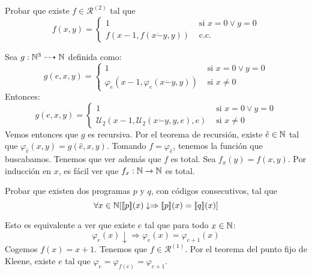 \documentclass[twoside]{article}
\begin{document}
\newpage

\begin{ejercicio}{18}
Probar que existe $f \in \mathcal{R}^{(2)}$ tal que
\[ f(x,y) = \begin{cases}
	1 &\text{ si }x = 0 \lor y = 0\\
	f(x-1, f(x\dot{-}y,y)) &\text{ c.c.}	
\end{cases}\]
\end{ejercicio}
\begin{solucion}
Sea $g : \mathbb{N}^3 \dashrightarrow \mathbb{N}$ definida como:
\[ g(e,x,y) = \begin{cases}
	1 &\text{ si }x = 0 \lor y = 0\\
	φ_e(x-1,φ_e(x\dot{-}y,y)) & \text{ si }x \neq 0
\end{cases}\]
Entonces:
\[ g(e,x,y) = \begin{cases}
	1 &\text{ si }x = 0 \lor y = 0\\
	\mathcal{U}_2(x-1,\mathcal{U}_2(x\dot{-}y,y,e),e) & \text{ si }x \neq 0
\end{cases}\]
Vemos entonces que $g$ es recursiva. Por el teorema de recursión, existe $\hat{e} \in \mathbb{N}$ tal que $φ_{\hat{e}} (x,y) = g(\hat{e},x,y)$. Tomando $f = φ_{\hat{e}}$, tenemos la función que buscabamos. Tenemos que ver además que $f$ es total. Sea $f_x(y) = f(x,y)$. Por inducción en $x$, es fácil ver que $f_x : \mathbb{N} \to \mathbb{N}$ es total.
\end{solucion}
\newpage

\begin{ejercicio}{20}
Probar que existen dos programas $p$ y $q$, con códigos consecutivos, tal que
\[ \forall x \in \mathbb{N} [ [\![p]\!](x) \downarrow \Rightarrow [\![p]\!](x) = [\![q]\!](x)]\]
\end{ejercicio}
\begin{solucion}
Esto es equivalente a ver que existe $e$ tal que para todo $x \in \mathbb{N}$:
\[ φ_e(x) \downarrow \Rightarrow φ_e(x)=φ_{e+1}(x) \]
Cogemos $f(x)=x+1$. Tenemos que $f \in \mathcal{R}^{(1)}$. Por el teorema del punto fijo de Kleene, existe $e$ tal que $φ_e = φ_{f(e)} = φ_{e+1}$.
\end{solucion}
\end{document}
